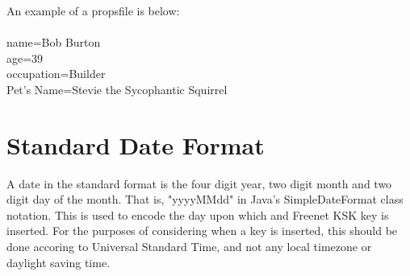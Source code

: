 \documentclass[12pt,a4paper]{article}
\begin{document}
An example of a propsfile is below: \\
\\
name=Bob Burton \\
age=39 \\
occupation=Builder \\
Pet's Name=Stevie the Sycophantic Squirrel \\

\section{Standard Date Format}
\label{standard_date}
A date in the standard format is the four digit year, two digit month and two digit day of the month. That is, "yyyyMMdd" in Java's SimpleDateFormat class notation. This is used to encode the day upon which and Freenet KSK key is inserted. For the purposes of considering when a key is inserted, this should be done accoring to Universal Standard Time, and not any local timezone or daylight saving time.
\end{document}
